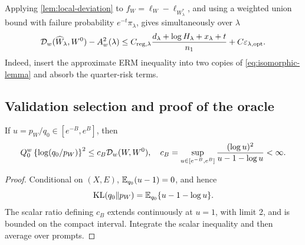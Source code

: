 Applying \cref{lem:local-deviation} to \(f_W=\ell_W-\ell_{W_\lambda^*}\), and using a weighted union bound with failure probability \(e^{-t}\pi_\lambda\), gives simultaneously over \(\lambda\)
\begin{equation}
\mathcal D_w(\widehat W_\lambda,W^0)-A_w^2(\lambda)
\le C_{\mathrm{reg},\lambda}
\frac{d_\lambda+\log H_\lambda+x_\lambda+t}{n_1}
+C\varepsilon_{\lambda,\mathrm{opt}}.
\label{eq:within-rate}
\end{equation}
Indeed, insert the approximate ERM inequality into two copies of \cref{eq:isomorphic-lemma} and absorb the quarter-risk terms.

\subsection{Validation selection and proof of the oracle}

\begin{lemma}
\label{lem:lr-bernstein}
If \(u=p_W/q_0\in[e^{-B},e^B]\), then
\[
Q_0^w\left\{\log(q_0/p_W)\right\}^2
\le c_B\mathcal D_w(W,W^0),
\quad
c_B=\sup_{u\in[e^{-B},e^B]}
\frac{(\log u)^2}{u-1-\log u}<\infty.
\]
\end{lemma}

\begin{proof}
Conditional on \((X,E)\), \(\mathbb E_{q_0}(u-1)=0\), and hence
\[
\operatorname{KL}(q_0\|p_W)=\mathbb E_{q_0}\{u-1-\log u\}.
\]
The scalar ratio defining \(c_B\) extends continuously at \(u=1\), with limit 2, and is bounded on the compact interval. Integrate the scalar inequality and then average over prompts.
\end{proof}

